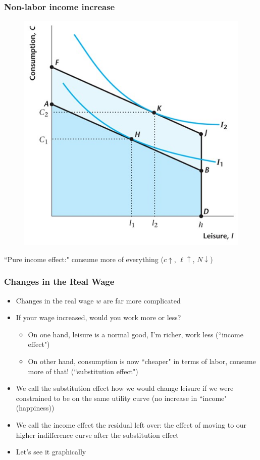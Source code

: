 \documentclass{beamer}
\begin{document}
\begin{frame}
\frametitle[alignment=center]{Non-labor income increase}
\begin{figure}
\centering
\includegraphics[scale=0.5]{Figures/W_Fig_4pt7.png}
\end{figure}
``Pure income effect:" consume more of everything ($c\uparrow$, $\ell\uparrow$, $N\downarrow$)
\end{frame}


\begin{frame}
\frametitle[alignment=center]{Changes in the Real Wage}
\begin{itemize}
\item Changes in the real wage $w$ are far more complicated
\bigskip
\item If your wage increased, would you work more or less?
\begin{itemize}
\item On one hand, leisure is a normal good, I'm richer, work less  (``income effect")
\item On other hand, consumption is now ``cheaper" in terms of labor, consume more of that! (``substitution effect")
\end{itemize}
\item We call the substitution effect how we would change leisure if we were constrained to be on the same utility curve (no increase in ``income" (happiness))
\item We call the income effect the residual left over: the effect of moving to our higher indifference curve after the substitution effect
\item Let's see it graphically
\end{itemize}
\end{frame}
\end{document}
